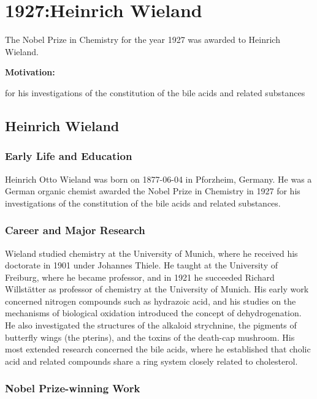 \chapter{1927:Heinrich Wieland}

\label{chap:chemistry1927}

The Nobel Prize in Chemistry for the year 1927 was awarded to Heinrich Wieland.

\textbf{Motivation:}

for his investigations of the constitution of the bile acids and related substances

\section{Heinrich Wieland}

\subsection*{Early Life and Education}

Heinrich Otto Wieland was born on 1877-06-04 in Pforzheim, Germany.
He was a German organic chemist awarded the Nobel Prize in Chemistry in 1927 for his investigations of the constitution of the bile acids and related substances.

\subsection*{Career and Major Research}

Wieland studied chemistry at the University of Munich, where he received his doctorate in 1901 under Johannes Thiele.
He taught at the University of Freiburg, where he became professor, and in 1921 he succeeded Richard Willstätter as professor of chemistry at the University of Munich.
His early work concerned nitrogen compounds such as hydrazoic acid, and his studies on the mechanisms of biological oxidation introduced the concept of dehydrogenation.
He also investigated the structures of the alkaloid strychnine, the pigments of butterfly wings (the pterins), and the toxins of the death-cap mushroom.
His most extended research concerned the bile acids, where he established that cholic acid and related compounds share a ring system closely related to cholesterol.

\subsection*{Nobel Prize-winning Work}

